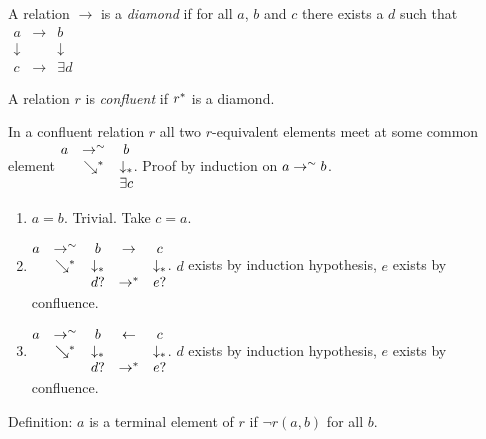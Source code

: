 \documentclass{article}
\begin{document}
\begin{definition}
A relation $\to$ is a \emph{diamond} if for all $a$, $b$ and $c$ there exists a $d$
such that
$
  \begin{matrix}
    a & \to & b \\
    \downarrow & & \downarrow \\
    c & \to & \exists d
  \end{matrix}
$
\end{definition}


\begin{definition}
  A relation $r$ is \emph{confluent} if $r^*$ is a diamond.
\end{definition}

\begin{theorem} In a confluent relation $r$ all two $r$-equivalent elements
  meet at some common element
  $
  \begin{matrix}
    a & \to^\sim & b \\
    & \searrow^* & \downarrow_*\\
    & & \exists c
  \end{matrix}
  $.
  Proof by induction on $a\to^\sim b$.
  \begin{enumerate}

  \item $a = b$. Trivial. Take $c = a$.

  \item
    $\begin{matrix}
      a & \to^\sim & b & \to & c\\
      & \searrow^* & \downarrow_*  & & \downarrow_*\\
      & & d? & \to^* & e?
    \end{matrix}$.
    $d$ exists by induction hypothesis, $e$ exists by confluence.

  \item
    $
    \begin{matrix}
      a & \to^\sim & b & \gets & c\\
      & \searrow^* & \downarrow_*  & & \downarrow_*\\
      & & d? & \to^* & e?
    \end{matrix}
    $.
    $d$ exists by induction hypothesis, $e$ exists by confluence.
  \end{enumerate}
\end{theorem}

Definition: $a$ is a terminal element of $r$ if $\neg r(a,b)$ for all $b$.
\end{document}

